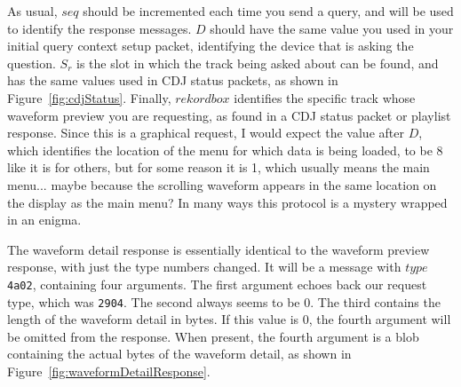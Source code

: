 \documentclass[11pt]{article}
\begin{document}
As usual, $seq$ should be incremented each time you send a query, and
will be used to identify the response messages. $D$ should have the
same value you used in your initial query context setup packet,
identifying the device that is asking the question. $S_r$ is the slot
in which the track being asked about can be found, and has the same
values used in CDJ status packets, as shown in
Figure~\ref{fig:cdjStatus}. Finally, $rekordbox$ identifies the
specific track whose waveform preview you are requesting, as found in
a CDJ status packet or playlist response. Since this is a graphical
request, I would expect the value after $D$, which identifies the
location of the menu for which data is being loaded, to be 8 like it
is for others, but for some reason it is 1, which usually means the
main menu... maybe because the scrolling waveform appears in the same
location on the display as the main menu? In many ways this protocol
is a mystery wrapped in an enigma.

The waveform detail response is essentially identical to the waveform
preview response, with just the type numbers changed. It will be a
message with $type$ {\tt 4a02}, containing four arguments. The first
argument echoes back our request type, which was {\tt 2904}. The
second always seems to be 0. The third contains the length of the
waveform detail in bytes. If this value is 0, the fourth argument
will be omitted from the response. When present, the fourth argument
is a blob containing the actual bytes of the waveform detail, as
shown in Figure~\ref{fig:waveformDetailResponse}.
\end{document}
